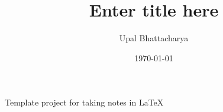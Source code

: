 \documentclass[a4paper,colorinlistoftodos]{article}
\author{Upal Bhattacharya}
\date{\today}
\title{Enter title here}
\begin{document}
\maketitle

\listoftodos

\linenumbers

Template project for taking notes in \LaTeX
\end{document}
